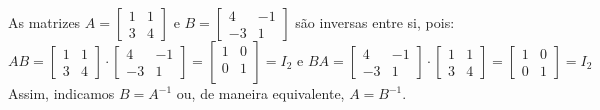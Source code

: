 \begin{example}
  As matrizes $A = \begin{bmatrix}
    1 & 1 \\
    3 & 4
  \end{bmatrix}$ e $B = \begin{bmatrix}
    4 & -1\\
    -3 & 1
  \end{bmatrix}$ são inversas entre si, pois:
  \begin{equation*}
    AB = \begin{bmatrix}
      1 & 1 \\
      3 & 4
    \end{bmatrix} \cdot \begin{bmatrix}
      4 & -1 \\
      -3 & 1
    \end{bmatrix} = \begin{bmatrix}
      1 & 0 \\
      0 & 1 \\
    \end{bmatrix} = I_2 \text{  e  } BA = \begin{bmatrix}
      4 & -1 \\
      -3 & 1
    \end{bmatrix} \cdot \begin{bmatrix}
      1 & 1 \\
      3 & 4
    \end{bmatrix} = \begin{bmatrix}
      1 & 0 \\
      0 & 1
    \end{bmatrix} = I_2
  \end{equation*} 
  Assim, indicamos $B = A^{-1}$ ou, de maneira equivalente, $A = B^{-1}$.
\end{example}


